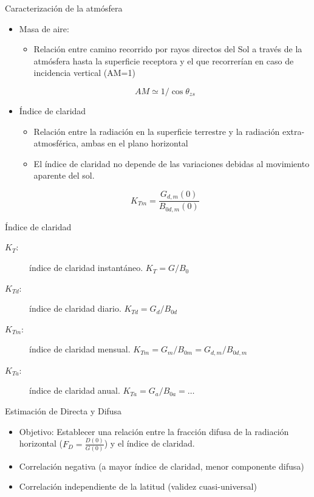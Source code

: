 \documentclass[xcolor={usenames,svgnames,dvipsnames}]{beamer}
\begin{document}
\begin{frame}[label={sec:org1942485}]{Caracterización de la atmósfera}
\begin{itemize}
\item \alert{Masa de aire}:

\begin{itemize}
\item Relación entre camino recorrido por rayos directos del Sol a
través de la atmósfera hasta la superficie receptora y el que recorrerían en caso de incidencia vertical (AM=1)
\end{itemize}

\[
     AM \simeq 1/\cos\theta_{zs}
   \]

\item \alert{Índice de claridad}

\begin{itemize}
\item Relación entre la radiación en la superficie terrestre y la
radiación extra-atmosférica, ambas en el plano horizontal

\item El índice de claridad \alert{no depende de las variaciones debidas al
movimiento aparente del sol}.
\end{itemize}

\[
     K_{Tm}=\frac{G_{d,m}(0)}{B_{0d,m}(0)}
   \]
\end{itemize}
\end{frame}

\begin{frame}[label={sec:org806d1a8}]{Índice de claridad}
\begin{description}
\item[{\(K_{T}\):}] índice de claridad instantáneo. \(K_{T}=G/B_{0}\)

\item[{\(K_{Td}\):}] índice de claridad diario. \(K_{Td}=G_{d}/B_{0d}\)

\item[{\(K_{Tm}\):}] índice de claridad mensual. \(K_{Tm}=G_{m}/B_{0m}=G_{d,m}/B_{0d,m}\)

\item[{\(K_{Ta}\):}] índice de claridad anual. \(K_{Ta} = G_{a}/B_{0a} = \dots\)
\end{description}
\end{frame}

\begin{frame}[label={sec:org1c37512}]{Estimación de Directa y Difusa}
\begin{itemize}
\item Objetivo: Establecer una \alert{relación entre la fracción difusa} de la radiación horizontal (\(F_{D}=\frac{D(0)}{G(0)}\)) y \alert{el índice de claridad}.

\item \alert{Correlación negativa} (a mayor índice de claridad, menor componente difusa)

\item \alert{Correlación independiente de la latitud} (validez cuasi-universal)
\end{itemize}
\end{frame}
\end{document}
